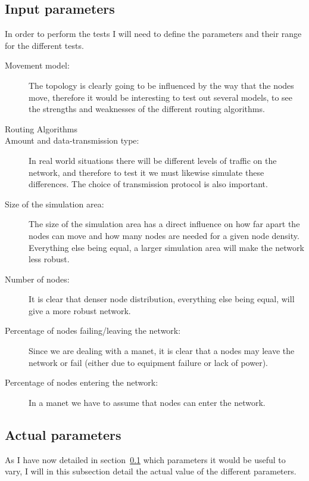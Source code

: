 \subsection{Input parameters}
\label{section:input_parameters}
In order to perform the tests I will need to define the parameters and their range for the different tests.
\begin{description}
\item[Movement model:] The topology is clearly going to be influenced by the way that the nodes move, therefore it would be interesting to test out several models, to see the strengths and weaknesses of the different routing algorithms.

\item[Routing Algorithms] 

\item[Amount and data-transmission type:] In real world situations there will be different levels of traffic on the network, and therefore to test it we must likewise simulate these differences. The choice of transmission protocol is also important.

\item[Size of the simulation area:] The size of the simulation area has a direct influence on how far apart the nodes can move and how many nodes are needed for a given node density. Everything else being equal, a larger simulation area will make the network less robust.

\item[Number of nodes:] It is clear that denser node distribution, everything else being equal, will give a more robust network.

\item[Percentage of nodes failing/leaving the network:] Since we are dealing with a \ac{manet}, it is clear that a nodes may leave the network or fail (either due to equipment failure or lack of power). 

\item[Percentage of nodes entering the network:] In a \ac{manet} we have to assume that nodes can enter the network.
\end{description}

\subsection{Actual parameters}
As I have now detailed in section~\ref{section:input_parameters} which parameters it would be useful to vary, I will in this subsection detail the actual value of the different parameters. 

